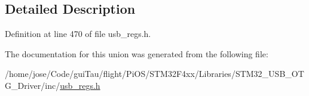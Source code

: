 \subsection{Detailed Description}


Definition at line 470 of file usb\-\_\-regs.\-h.



The documentation for this union was generated from the following file\-:\begin{DoxyCompactItemize}
\item 
/home/jose/\-Code/gui\-Tau/flight/\-Pi\-O\-S/\-S\-T\-M32\-F4xx/\-Libraries/\-S\-T\-M32\-\_\-\-U\-S\-B\-\_\-\-O\-T\-G\-\_\-\-Driver/inc/\hyperlink{_s_t_m32_f4xx_2_libraries_2_s_t_m32___u_s_b___o_t_g___driver_2inc_2usb__regs_8h}{usb\-\_\-regs.\-h}\end{DoxyCompactItemize}
